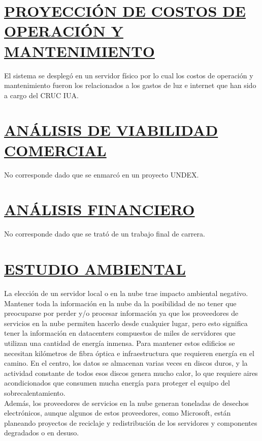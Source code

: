 \section{\underline{PROYECCIÓN DE COSTOS DE OPERACIÓN Y MANTENIMIENTO}}
El sistema se desplegó en un servidor físico por lo cual los costos de operación y mantenimiento fueron los relacionados a los gastos de luz e internet que han sido a cargo del CRUC IUA. \\

\section{\underline{ANÁLISIS DE VIABILIDAD COMERCIAL}}
No corresponde dado que se enmarcó en un proyecto UNDEX.\\

\section{\underline{ANÁLISIS FINANCIERO}}
No corresponde dado que se trató de un trabajo final de carrera.\\


\section{\underline{ESTUDIO AMBIENTAL}}
La elección de un servidor local o en la nube trae impacto ambiental negativo.\\

Mantener toda la información en la nube da la posibilidad de no tener que preocuparse por perder y/o procesar información ya que los proveedores de servicios en la nube permiten hacerlo desde cualquier lugar, pero esto significa tener la información en datacenters compuestos de miles de servidores que utilizan una cantidad de energía inmensa. Para mantener estos edificios se necesitan kilómetros de fibra óptica e infraestructura que requieren energía en el camino. En el centro, los datos se almacenan varias veces en discos duros, y la actividad constante de todos esos discos genera mucho calor, lo que requiere aires acondicionados que consumen mucha energía para proteger el equipo del sobrecalentamiento.\\
Además, los proveedores de servicios en la nube generan toneladas de desechos electrónicos, aunque algunos de estos proveedores, como Microsoft, están planeando proyectos de reciclaje y redistribución de los servidores y componentes degradados o en desuso.
\\

